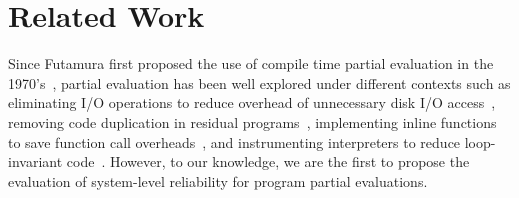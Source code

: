 \section{Related Work}
\label{sec:related-work}

Since Futamura first proposed the use of compile time partial evaluation in the 1970’s~\cite{Futamura}, partial evaluation has been well explored under different contexts such as eliminating I/O operations to reduce overhead of unnecessary disk I/O access~\cite{Smowton}, removing code duplication in residual programs~\cite{Debois}, implementing inline functions to save function call overheads~\cite{Jones1996}, and instrumenting interpreters to reduce loop-invariant code~\cite{Jones1993}.
However, to our knowledge, we are the first to propose the evaluation of system-level reliability for program partial evaluations.  
